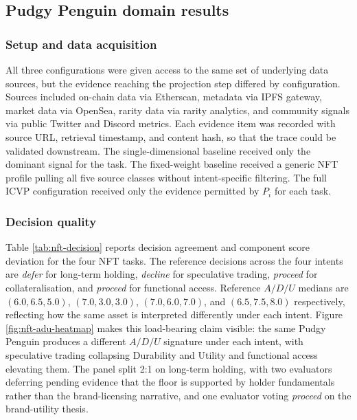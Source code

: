 \subsection{Pudgy Penguin domain results}

\subsubsection{Setup and data acquisition}

All three configurations were given access to the same set of underlying data sources, but the evidence reaching the projection step differed by configuration. Sources included on-chain data via Etherscan, metadata via IPFS gateway, market data via OpenSea, rarity data via rarity analytics, and community signals via public Twitter and Discord metrics. Each evidence item was recorded with source URL, retrieval timestamp, and content hash, so that the trace could be validated downstream. The single-dimensional baseline received only the dominant signal for the task. The fixed-weight baseline received a generic NFT profile pulling all five source classes without intent-specific filtering. The full ICVP configuration received only the evidence permitted by $P_i$ for each task.

\subsubsection{Decision quality}

Table \ref{tab:nft-decision} reports decision agreement and component score deviation for the four NFT tasks. The reference decisions across the four intents are \textit{defer} for long-term holding, \textit{decline} for speculative trading, \textit{proceed} for collateralisation, and \textit{proceed} for functional access. Reference $A/D/U$ medians are $(6.0, 6.5, 5.0)$, $(7.0, 3.0, 3.0)$, $(7.0, 6.0, 7.0)$, and $(6.5, 7.5, 8.0)$ respectively, reflecting how the same asset is interpreted differently under each intent. Figure \ref{fig:nft-adu-heatmap} makes this load-bearing claim visible: the same Pudgy Penguin produces a different $A/D/U$ signature under each intent, with speculative trading collapsing Durability and Utility and functional access elevating them. The panel split 2:1 on long-term holding, with two evaluators deferring pending evidence that the floor is supported by holder fundamentals rather than the brand-licensing narrative, and one evaluator voting \textit{proceed} on the brand-utility thesis.

